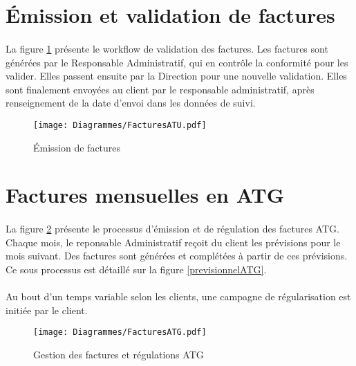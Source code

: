 \section{Émission et validation de factures}

\paragraph{} La figure \ref{validationFactures} présente le workflow de validation des factures. Les factures sont générées par le Responsable Administratif, qui en contrôle la conformité pour les valider. Elles passent ensuite par la Direction pour une nouvelle validation. Elles sont finalement envoyées au client par le responsable administratif, après renseignement de la date d'envoi dans les données de suivi.
	
\begin{figure}
	\centering
	\begin{sideways}
		\texttt{[image: Diagrammes/FacturesATU.pdf]}
	\end{sideways}
	\caption{Émission de factures}
	\label{validationFactures}	
\end{figure}

\section{Factures mensuelles en ATG}
\paragraph{} La figure \ref{facturesATG} présente le processus d'émission et de régulation des factures ATG. Chaque mois, le reponsable Administratif reçoit du client les prévisions pour le mois suivant. Des factures sont générées et complétées à partir de ces prévisions. Ce sous processus est détaillé sur la figure \ref{previsionnelATG}.
\paragraph{} Au bout d'un temps variable selon les clients, une campagne de régularisation est initiée par le client.    

\begin{figure}
	\centering
		\texttt{[image: Diagrammes/FacturesATG.pdf]}
	\caption{Gestion des factures et régulations ATG}
	\label{facturesATG}	
\end{figure}	



